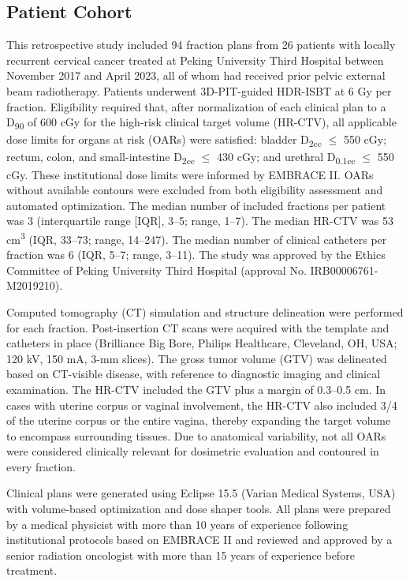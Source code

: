 \documentclass[12pt,twoside,letterpaper]{article}
\begin{document}
\subsection{Patient Cohort}\label{sec:2-1}

This retrospective study included 94 fraction plans from 26 patients with locally recurrent cervical cancer treated at Peking University Third Hospital between November 2017 and April 2023, all of whom had received prior pelvic external beam radiotherapy. Patients underwent 3D-PIT-guided HDR-ISBT at 6 Gy per fraction. Eligibility required that, after normalization of each clinical plan to a D\textsubscript{90} of 600 cGy for the high-risk clinical target volume (HR-CTV), all applicable dose limits for organs at risk (OARs) were satisfied: bladder D\textsubscript{2cc} \ensuremath{\leq} 550 cGy; rectum, colon, and small-intestine D\textsubscript{2cc} \ensuremath{\leq} 430 cGy; and urethral D\textsubscript{0.1cc} \ensuremath{\leq} 550 cGy. These institutional dose limits were informed by EMBRACE II.\cite{ref75} OARs without available contours were excluded from both eligibility assessment and automated optimization. The median number of included fractions per patient was 3 (interquartile range [IQR], 3--5; range, 1--7). The median HR-CTV was 53 cm\textsuperscript{3} (IQR, 33--73; range, 14--247). The median number of clinical catheters per fraction was 6 (IQR, 5--7; range, 3--11). The study was approved by the Ethics Committee of Peking University Third Hospital (approval No. IRB00006761-M2019210).

Computed tomography (CT) simulation and structure delineation were performed for each fraction. Post-insertion CT scans were acquired with the template and catheters in place (Brilliance Big Bore, Philips Healthcare, Cleveland, OH, USA; 120 kV, 150 mA, 3-mm slices). The gross tumor volume (GTV) was delineated based on CT-visible disease, with reference to diagnostic imaging and clinical examination. The HR-CTV included the GTV plus a margin of 0.3--0.5 cm. In cases with uterine corpus or vaginal involvement, the HR-CTV also included 3/4 of the uterine corpus or the entire vagina, thereby expanding the target volume to encompass surrounding tissues. Due to anatomical variability, not all OARs were considered clinically relevant for dosimetric evaluation and contoured in every fraction.

Clinical plans were generated using Eclipse 15.5 (Varian Medical Systems, USA) with volume-based optimization and dose shaper tools. All plans were prepared by a medical physicist with more than 10 years of experience following institutional protocols based on EMBRACE II\cite{ref75} and reviewed and approved by a senior radiation oncologist with more than 15 years of experience before treatment.
\end{document}
